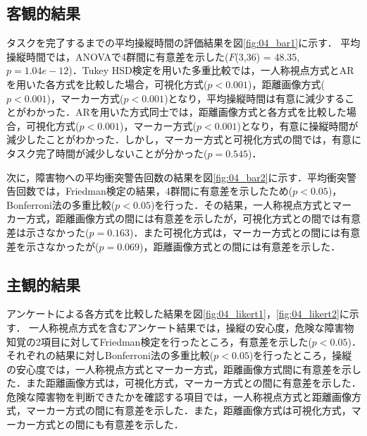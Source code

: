 \documentclass[submit,techrep]{ipsj}
\begin{document}

\subsection{客観的結果}
\label{result_1}
タスクを完了するまでの平均操縦時間の評価結果を図\ref{fig:04_bar1}に示す．
平均操縦時間では，ANOVAで4群間に有意差を示した($F$(3,36) = 48.35, $p = 1.04e-12 $)．Tukey HSD検定を用いた多重比較では，一人称視点方式とARを用いた各方式を比較した場合，可視化方式($p < 0.001$)，距離画像方式($p < 0.001$)，マーカー方式($p < 0.001$)となり，平均操縦時間は有意に減少することがわかった．ARを用いた方式同士では，距離画像方式と各方式を比較した場合，可視化方式($p < 0.001$)，マーカー方式($p < 0.001$)となり，有意に操縦時間が減少したことがわかった．しかし，マーカー方式と可視化方式の間では，有意にタスク完了時間が減少しないことが分かった($p = 0.545$)．
\par
次に，障害物への平均衝突警告回数の結果を図\ref{fig:04_bar2}に示す．平均衝突警告回数では，Friedman検定の結果，4群間に有意差を示したため($p < 0.05$)，Bonferroni法の多重比較($p < 0.05$)を行った．その結果，一人称視点方式とマーカー方式，距離画像方式の間には有意差を示したが，可視化方式との間では有意差は示さなかった($p = 0.163$)．また可視化方式は，マーカー方式との間には有意差を示さなかったが($p = 0.069$)，距離画像方式との間には有意差を示した．


\subsection{主観的結果}
\label{result_2}
アンケートによる各方式を比較した結果を図\ref{fig:04_likert1}，\ref{fig:04_likert2}に示す．
一人称視点方式を含むアンケート結果では，操縦の安心度，危険な障害物知覚の2項目に対してFriedman検定を行ったところ，有意差を示した($p < 0.05$)．それぞれの結果に対しBonferroni法の多重比較($p < 0.05$)を行ったところ，操縦の安心度では，一人称視点方式とマーカー方式，距離画像方式間に有意差を示した．また距離画像方式は，可視化方式，マーカー方式との間に有意差を示した．危険な障害物を判断できたかを確認する項目では，一人称視点方式と距離画像方式，マーカー方式の間に有意差を示した．また，距離画像方式は可視化方式，マーカー方式との間にも有意差を示した．
\end{document}
